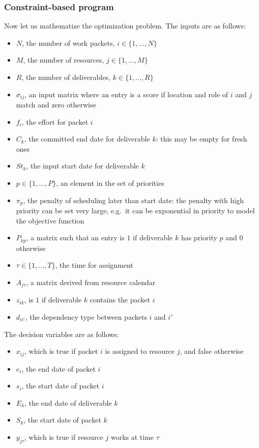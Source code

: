 \documentclass[10pt,journal,cspaper,compsoc]{IEEEtran}
\begin{document}
\subsubsection{Constraint-based program}
Now let us mathematize the optimization problem.  The inputs are as follows:
\begin{itemize}
  \item $N$, the number of work packets, $i\in\{1,\ldots,N\}$
  \item $M$, the number of resources, $j\in\{1,\ldots,M\}$
  \item $R$, the number of deliverables, $k\in\{1,\ldots,R\}$
  \item $\sigma_{ij}$, an input matrix where an entry is a score if location and role of $i$ and $j$ match and zero otherwise
  \item $f_i$, the effort for packet $i$
  \item $C_k$, the committed end date for deliverable $k$: this may be empty for fresh ones
  \item $St_k$, the input start date for deliverable $k$
  \item $p\in\{1,\ldots,P\}$, an element in the set of priorities
  \item $\pi_p$, the penalty of scheduling later than start date: the penalty with high priority can be set very large, e.g.\ it can be exponential in priority to model the objective function
  \item $P_{kp}$, a matrix such that an entry is $1$ if deliverable $k$ has priority $p$ and 0 otherwise
  \item $\tau \in \{1,\ldots,T\}$, the time for assignment
  \item $A_{j\tau}$, a matrix derived from resource calendar
  \item $z_{ik}$, is $1$ if deliverable $k$ contains the packet $i$
  \item $d_{ii'}$, the dependency type between packets $i$ and $i'$
\end{itemize}
The decision variables are as follows:
\begin{itemize}
  \item $x_{ij}$, which is true if packet $i$ is assigned to resource $j$, and false otherwise
  \item $e_{i}$, the end date of packet $i$
  \item $s_{i}$, the start date of packet $i$
  \item $E_{k}$, the end date of deliverable $k$
  \item $S_{k}$, the start date of packet $k$
  \item $y_{j\tau}$, which is true if resource $j$ works at time $\tau$
\end{itemize}
\end{document}
